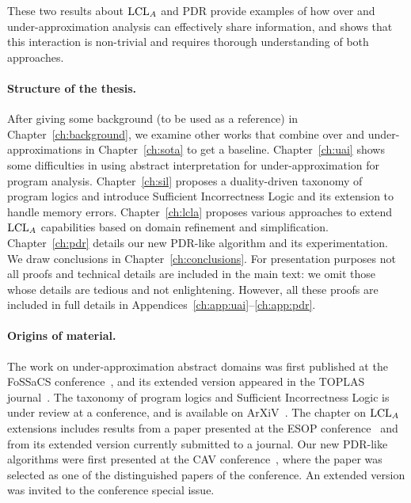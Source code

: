 These two results about $\text{LCL}_A$ and PDR provide examples of how over and under-approximation analysis can effectively share information, and shows that this interaction is non-trivial and requires thorough understanding of both approaches.

\paragraph*{Structure of the thesis.}
After giving some background (to be used as a reference) in Chapter~\ref{ch:background}, we examine other works that combine over and under-approximations in Chapter~\ref{ch:sota} to get a baseline.
Chapter~\ref{ch:uai} shows some difficulties in using abstract interpretation for under\hyp{}approximation for program analysis.
Chapter~\ref{ch:sil} proposes a duality-driven taxonomy of program logics and introduce Sufficient Incorrectness Logic and its extension to handle memory errors.
Chapter~\ref{ch:lcla} proposes various approaches to extend $\text{LCL}_A$ capabilities based on domain refinement and simplification.
Chapter~\ref{ch:pdr} details our new PDR-like algorithm and its experimentation.
We draw conclusions in Chapter~\ref{ch:conclusions}.
For presentation purposes not all proofs and technical details are included in the main text: we omit those whose details are tedious and not enlightening. However, all these proofs are included in full details in Appendices~\ref{ch:app:uai}--\ref{ch:app:pdr}.

\paragraph*{Origins of material.}
The work on under-approximation abstract domains was first published at the FoSSaCS conference~\cite{ABG22}, and its extended version appeared in the TOPLAS journal~\cite{ABG24}. The taxonomy of program logics and Sufficient Incorrectness Logic is under review at a conference, and is available on ArXiV~\cite{ABGL24}.
The chapter on $\text{LCL}_A$ extensions includes results from a paper presented at the ESOP conference~\cite{ABG23} and from its extended version currently submitted to a journal.
Our new PDR-like algorithms were first presented at the CAV conference~\cite{KABBGH23}, where the paper was selected as one of the distinguished papers of the conference. An extended version was invited to the conference special issue.
